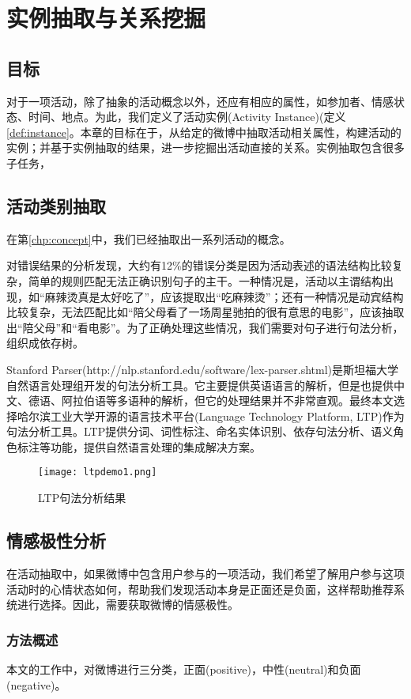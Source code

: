 \chapter{实例抽取与关系挖掘}
\section{目标}
对于一项活动，除了抽象的活动概念以外，还应有相应的属性，如参加者、情感状态、时间、地点。为此，我们定义了活动实例(Activity Instance)(定义\ref{def:instance}。本章的目标在于，从给定的微博中抽取活动相关属性，构建活动的实例；并基于实例抽取的结果，进一步挖掘出活动直接的关系。实例抽取包含很多子任务，

\section{活动类别抽取}
在第\ref{chp:concept}中，我们已经抽取出一系列活动的概念。

对错误结果的分析发现，大约有12\%的错误分类是因为活动表述的语法结构比较复杂，简单的规则匹配无法正确识别句子的主干。一种情况是，活动以主谓结构出现，如``麻辣烫真是太好吃了''，应该提取出``吃麻辣烫''；还有一种情况是动宾结构比较复杂，无法匹配比如``陪父母看了一场周星驰拍的很有意思的电影''，应该抽取出``陪父母''和``看电影''。为了正确处理这些情况，我们需要对句子进行句法分析，组织成依存树。

Stanford Parser(http://nlp.stanford.edu/software/lex-parser.shtml)是斯坦福大学自然语言处理组开发的句法分析工具。它主要提供英语语言的解析，但是也提供中文、德语、阿拉伯语等多语种的解析，但它的处理结果并不非常直观。最终本文选择哈尔滨工业大学开源的语言技术平台(Language Technology Platform, LTP)\cite{che2010ltp}作为句法分析工具。LTP提供分词、词性标注、命名实体识别、依存句法分析、语义角色标注等功能，提供自然语言处理的集成解决方案。

\begin{figure}[!h]
\centering
\texttt{[image: ltpdemo1.png]}
\caption{LTP句法分析结果}
\label{fig:ltp_demo}
\end{figure}

\section{情感极性分析}
在活动抽取中，如果微博中包含用户参与的一项活动，我们希望了解用户参与这项活动时的心情状态如何，帮助我们发现活动本身是正面还是负面，这样帮助推荐系统进行选择。因此，需要获取微博的情感极性。

\subsection{方法概述}
本文的工作中，对微博进行三分类，正面(positive)，中性(neutral)和负面(negative)。

